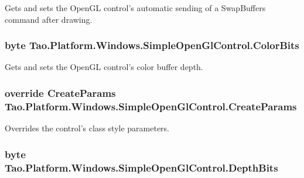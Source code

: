 Gets and sets the OpenGL control's automatic sending of a SwapBuffers command after drawing. 

\hypertarget{class_tao_1_1_platform_1_1_windows_1_1_simple_open_gl_control_ab1f846be9a246005878d9309bd53c629}{
\subsubsection[{ColorBits}]{\setlength{\rightskip}{0pt plus 5cm}byte Tao.Platform.Windows.SimpleOpenGlControl.ColorBits}}
\label{class_tao_1_1_platform_1_1_windows_1_1_simple_open_gl_control_ab1f846be9a246005878d9309bd53c629}


Gets and sets the OpenGL control's color buffer depth. 

\hypertarget{class_tao_1_1_platform_1_1_windows_1_1_simple_open_gl_control_a3850115da1500aff227e2e7f9619462a}{
\subsubsection[{CreateParams}]{\setlength{\rightskip}{0pt plus 5cm}override CreateParams Tao.Platform.Windows.SimpleOpenGlControl.CreateParams}}
\label{class_tao_1_1_platform_1_1_windows_1_1_simple_open_gl_control_a3850115da1500aff227e2e7f9619462a}


Overrides the control's class style parameters. 

\hypertarget{class_tao_1_1_platform_1_1_windows_1_1_simple_open_gl_control_a3956619c7ebd2b05882aa0ee26534281}{
\subsubsection[{DepthBits}]{\setlength{\rightskip}{0pt plus 5cm}byte Tao.Platform.Windows.SimpleOpenGlControl.DepthBits}}
\label{class_tao_1_1_platform_1_1_windows_1_1_simple_open_gl_control_a3956619c7ebd2b05882aa0ee26534281}



